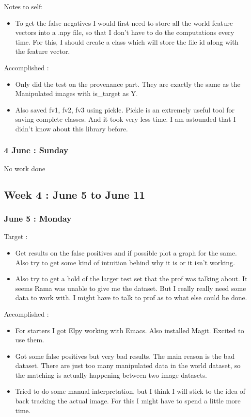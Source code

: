 \documentclass{article}
\begin{document}
Notes to self:
\begin{itemize}
\item To get the false negatives I would first need to store all the world feature vectors into a .npy file, so that I don't have to do the computations every time. For this, I should create a class which will store the file id along with the feature vector.
\end{itemize}

Accomplished :
\begin{itemize}
\item Only did the test on the provenance part. They are exactly the same as the Manipulated images with is\_target as Y.
\item Also saved fv1, fv2, fv3 using pickle. Pickle is an extremely useful tool for saving complete classes. And it took very less time. I am astounded that I didn't know about this library before.
\end{itemize}

\subsubsection{4 June : Sunday}
No work done
\subsection{Week 4 : June 5 to June 11}
\subsubsection{June 5 : Monday}
Target :
\begin{itemize}
\item Get results on the false positives and if possible plot a graph for the same. Also try to get some kind of intuition behind why it is or it isn't working.
\item Also try to get a hold of the larger test set that the prof was talking about. It seems Rama was unable to give me the dataset. But I really really need some data to work with. I might have to talk to prof as to what else could be done.
\end{itemize}

Accomplished :
\begin{itemize}
\item For starters I got Elpy working with Emacs. Also installed Magit. Excited to use them.
\item Got some false positives but very bad results. The main reason is the bad dataset. There are just too many manipulated data in the world dataset, so the matching is actually happening between two image datasets.
\item Tried to do some manual interpretation, but I think I will stick to the idea of back tracking the actual image. For this I might have to spend a little more time.
\end{itemize}
\end{document}
